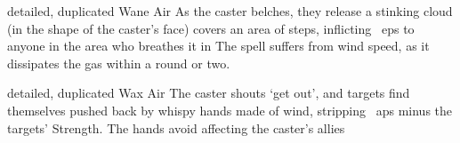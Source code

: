 \ifodd\value{diceNo}
  {detailed, duplicated}%
  {Wane}%
  {Air}%
  {}%
  {As the caster belches, they release a stinking cloud (in the shape of the caster's face) covers an area of  \glspl{step}, inflicting ~\glspl{ep} to anyone in the area who breathes it in}%
  {
    The spell suffers from wind speed, as it dissipates the gas within a round or two.
  }

\else

  {detailed, duplicated}%
  {Wax}%
  {Air}%
  {}%
  {The caster shouts `get out', and  targets find themselves pushed back by whispy hands made of wind, stripping ~\glspl{ap} minus the targets' Strength.
  The hands avoid affecting the caster's allies}%
  {}

\fi
{}
